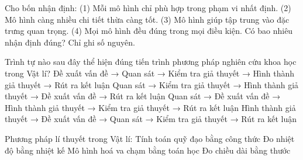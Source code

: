 \begin{ex}
Cho bốn nhận định: (1) Mỗi mô hình chỉ phù hợp trong phạm vi nhất định. (2) Mô hình càng nhiều chi tiết thừa càng tốt. (3) Mô hình giúp tập trung vào đặc trưng quan trọng. (4) Mọi mô hình đều đúng trong mọi điều kiện. Có bao nhiêu nhận định đúng? Chỉ ghi số nguyên.
\end{ex}

\begin{ex}
Trình tự nào sau đây thể hiện đúng tiến trình phương pháp nghiên cứu khoa học trong Vật lí?
\choice
{Đề xuất vấn đề → Quan sát → Kiểm tra giả thuyết → Hình thành giả thuyết → Rút ra kết luận}
{Quan sát → Kiểm tra giả thuyết → Hình thành giả thuyết → Đề xuất vấn đề → Rút ra kết luận}
{\True Quan sát → Đề xuất vấn đề → Hình thành giả thuyết → Kiểm tra giả thuyết → Rút ra kết luận}
{Hình thành giả thuyết → Đề xuất vấn đề → Quan sát → Kiểm tra giả thuyết → Rút ra kết luận}
\end{ex}

\begin{ex}
Phương pháp lí thuyết trong Vật lí:
\choiceTF
{\True Tính toán quỹ đạo bằng công thức}
{Đo nhiệt độ bằng nhiệt kế}
{\True Mô hình hoá va chạm bằng toán học}
{Đo chiều dài bằng thước}
\end{ex}

